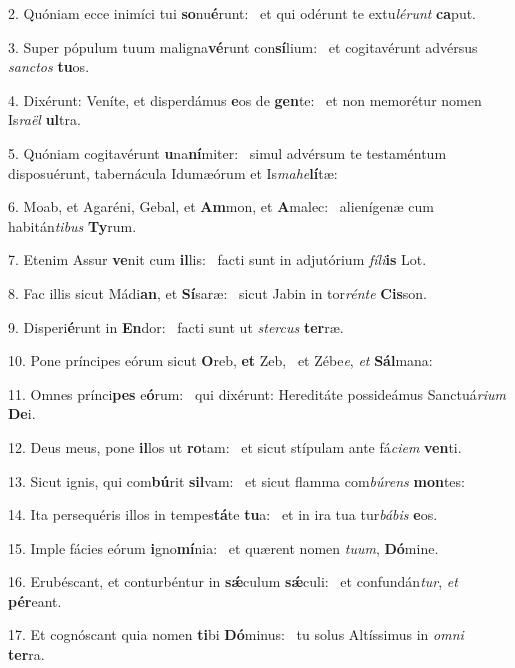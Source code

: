 2. Quóniam ecce inimíci tui \textbf{so}nu\textbf{é}runt: \ast\  et qui odérunt te extu\textit{lé}\textit{runt} \textbf{ca}put.\

3. Super pópulum tuum maligna\textbf{vé}runt con\textbf{sí}lium: \ast\  et cogitavérunt advérsus \textit{sanc}\textit{tos} \textbf{tu}os.\

4. Dixérunt: Veníte, et disperdámus \textbf{e}os de \textbf{gen}te: \ast\  et non memorétur nomen Is\textit{ra}\textit{ël} \textbf{ul}tra.\

5. Quóniam cogitavérunt \textbf{u}na\textbf{ní}miter: \ast\  simul advérsum te testaméntum disposuérunt, tabernácula Idumæórum et Is\textit{ma}\textit{he}\textbf{lí}tæ:\

6. Moab, et Agaréni, Gebal, et \textbf{Am}mon, et \textbf{A}malec: \ast\  alienígenæ cum habitán\textit{ti}\textit{bus} \textbf{Ty}rum.\

7. Etenim Assur \textbf{ve}nit cum \textbf{il}lis: \ast\  facti sunt in adjutórium \textit{fí}\textit{li}\textbf{is} Lot.\

8. Fac illis sicut Mádi\textbf{an}, et \textbf{Sí}saræ: \ast\  sicut Jabin in tor\textit{rén}\textit{te} \textbf{Cis}son.\

9. Disperi\textbf{é}runt in \textbf{En}dor: \ast\  facti sunt ut \textit{ster}\textit{cus} \textbf{ter}ræ.\

10. Pone príncipes eórum sicut \textbf{O}reb, \textbf{et} Zeb, \ast\  et Zébe\textit{e}, \textit{et} \textbf{Sál}mana:\

11. Omnes prínci\textbf{pes} e\textbf{ó}rum: \ast\  qui dixérunt: Hereditáte possideámus Sanctuá\textit{ri}\textit{um} \textbf{De}i.\

12. Deus meus, pone \textbf{il}los ut \textbf{ro}tam: \ast\  et sicut stípulam ante fá\textit{ci}\textit{em} \textbf{ven}ti.\

13. Sicut ignis, qui com\textbf{bú}rit \textbf{sil}vam: \ast\  et sicut flamma com\textit{bú}\textit{rens} \textbf{mon}tes:\

14. Ita persequéris illos in tempes\textbf{tá}te \textbf{tu}a: \ast\  et in ira tua tur\textit{bá}\textit{bis} \textbf{e}os.\

15. Imple fácies eórum \textbf{i}gno\textbf{mí}nia: \ast\  et quærent nomen \textit{tu}\textit{um}, \textbf{Dó}mine.\

16. Erubéscant, et conturbéntur in \textbf{sǽ}culum \textbf{sǽ}culi: \ast\  et confundán\textit{tur}, \textit{et} \textbf{pér}eant.\

17. Et cognóscant quia nomen \textbf{ti}bi \textbf{Dó}minus: \ast\  tu solus Altíssimus in \textit{om}\textit{ni} \textbf{ter}ra.\

